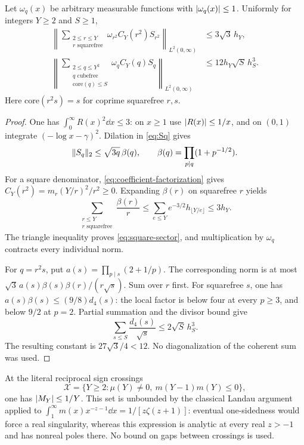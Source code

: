 \begin{theorem}\label{thm:small-core}
Let $\omega_q(x)$ be arbitrary measurable functions with $\lvert\omega_q(x)\rvert\le1$. Uniformly for integers $Y\ge2$ and $S\ge1$,
\begin{align}
 \left\|\sum_{\substack{2\le r\le Y\\r\text{ squarefree}}}
       \omega_{r^2}C_Y(r^2)S_{r^2}\right\|_{L^2(0,\infty)}
 &\le3\sqrt3\,h_Y,\label{eq:square-sector}\\
 \left\|\sum_{\substack{2\le q\le Y^2\\q\text{ cubefree}\\
                    \mathrm{core}(q)\le S}}
       \omega_q C_Y(q)S_q\right\|_{L^2(0,\infty)}
 &\le12h_Y\sqrt S\,h_S^3.
 \label{eq:core-sector}
\end{align}
Here $\mathrm{core}(r^2s)=s$ for coprime squarefree $r,s$.
\end{theorem}
\begin{proof}
One has $\int_0^\infty R(x)^2\dd x\le3$: on $x\ge1$ use $\lvert R(x)\rvert\le1/x$, and on $(0,1)$ integrate $(-\log x-\gamma)^2$. Dilation in \eqref{eq:Sq} gives
\[
 \lVert S_q\rVert_2\le\sqrt{3q}\,\beta(q),\qquad
 \beta(q)=\prod_{p\mid q}(1+p^{-1/2}).
\]
For a square denominator, \eqref{eq:coefficient-factorization} gives
$C_Y(r^2)=m_r(Y/r)^2/r^2\ge0$. Expanding $\beta(r)$ on squarefree $r$ yields
\[
 \sum_{\substack{r\le Y\\r\text{ squarefree}}}\frac{\beta(r)}r
 \le\sum_{e\le Y}e^{-3/2}h_{\lfloor Y/e\rfloor}
 \le3h_Y.
\]
The triangle inequality proves \eqref{eq:square-sector}, and multiplication by $\omega_q$ contracts every individual norm.

For $q=r^2s$, put $a(s)=\prod_{p\mid s}(2+1/p)$. The corresponding norm is at most
$\sqrt3\,a(s)\beta(s)\beta(r)/(r\sqrt s)$. Sum over $r$ first. For squarefree $s$, one has $a(s)\beta(s)\le(9/8)d_4(s)$: the local factor is below four at every $p\ge3$, and below $9/2$ at $p=2$. Partial summation and the divisor bound give
\[
 \sum_{s\le S}\frac{d_4(s)}{\sqrt s}\le2\sqrt S\,h_S^3.
\]
The resulting constant is $27\sqrt3/4<12$. No diagonalization of the coherent sum was used.
\end{proof}

At the literal reciprocal sign crossings
\[
 \mathcal X=\{Y\ge2:\mu(Y)\ne0,\ m(Y-1)m(Y)\le0\},
\]
one has $\lvert M_Y\rvert\le1/Y$. This set is unbounded by the classical Landau argument applied to
$\int_1^\infty m(x)x^{-z-1}\dd x=1/[z\zeta(z+1)]$: eventual one-sidedness would force a real singularity, whereas this expression is analytic at every real $z>-1$ and has nonreal poles there. No bound on gaps between crossings is used.

